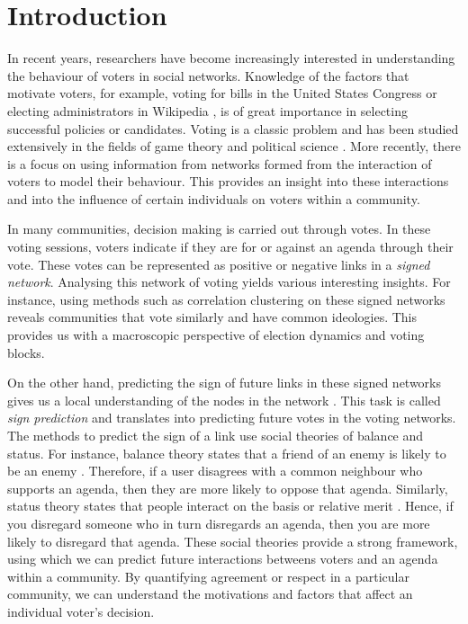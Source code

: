 \chapter{Introduction}



In recent years, researchers have become increasingly interested in understanding the behaviour of voters in social networks. Knowledge of the factors that motivate voters, for example, voting for bills in the United States Congress \cite{karimi2019multicongress} or electing administrators in Wikipedia \cite{jankowski-lorek2013MBSN,cabunducan2011voting,lee2012uncovering}, is of great importance in selecting successful policies or candidates. Voting is a classic problem and has been studied extensively in the fields of game theory and political science \cite{zou2015strategicDoodle,kearns2009behavioral,tal2015a}. More recently, there is a focus on using information from networks formed from the interaction of voters to model their behaviour. This provides an insight into these interactions and into the influence of certain individuals on voters within a community.

In many communities, decision making is carried out through votes.
In these voting sessions, voters indicate if they are for or against an agenda through their vote.
These votes can be represented as positive or negative links in a \textit{signed network}.
Analysing this network of voting yields various interesting insights.
For instance, using methods such as correlation clustering \cite{brito2020aBrazil,levorato2016brazilian,chiang2014prediction} on these signed networks reveals communities that vote similarly and have common ideologies. 
This provides us with a macroscopic perspective of election dynamics and voting blocks.

On the other hand, predicting the sign of future links in these signed networks gives us a local understanding of the nodes in the network \cite{leskovec2010predicting,leskovec2010signed,chiang2011exploiting}.
This task is called \textit{sign prediction} and translates into predicting future votes in the voting networks.
The methods to predict the sign of a link use social theories of balance and status.
For instance, balance theory states that a friend of an enemy is likely to be an enemy \cite{harary1953on}.
Therefore, if a user disagrees with a common neighbour who supports an agenda, then they are more likely to oppose that agenda. 
Similarly, status theory states that people interact on the basis or relative merit \cite{leskovec2010predicting}.
Hence, if you disregard someone who in turn disregards an agenda, then you are more likely to disregard that agenda.
These social theories provide a strong framework, using which we can predict future interactions betweens voters and an agenda within a community.
By quantifying agreement or respect in a particular community, we can understand the motivations and factors that affect an individual voter's decision.

